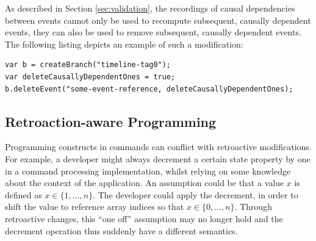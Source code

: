 As described in Section \ref{sec:validation}, the recordings of causal dependencies 
between events cannot only be used to recompute subsequent, causally dependent events, 
they can also be used to remove subsequent, causally dependent events. 
The following listing depicts an example of such a modification:

\begin{lstlisting}[style=styled]
var b = createBranch("timeline-tag0");
var deleteCausallyDependentOnes = true;
b.deleteEvent("some-event-reference, deleteCausallyDependentOnes);
\end{lstlisting}


\pagebreak
\subsection{Retroaction-aware Programming}
\label{sec:rap}
Programming constructs in commands can conflict with retroactive modifications.
For example, a developer might always decrement a certain state property by one in a
command processing implementation, whilst relying on some knowledge about the context 
of the application. 
An assumption could be that a value $x$ is defined as $x \in \{1,\dotso,n\}$.
The developer could apply the decrement, in order to shift the value to reference 
array indices so that $x \in \{0,\dotso,n\}$.
Through retroactive changes, this ``one off'' assumption may no longer hold and the 
decrement operation thus suddenly have a different semantics.

